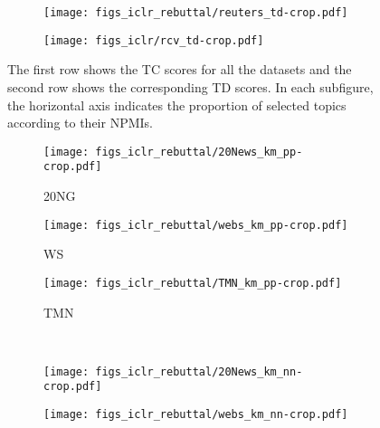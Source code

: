 \documentclass{article}
\begin{document}
\begin{figure}[t]
\begin{subfigure}[b]{0.19\linewidth}
                 \centering
                 \texttt{[image: figs\_iclr\_rebuttal/reuters\_td-crop.pdf]}
         \end{subfigure}
          \begin{subfigure}[b]{0.19\linewidth}
                 \centering
                 \texttt{[image: figs\_iclr/rcv\_td-crop.pdf]}
         \end{subfigure}
\caption{The first row shows the TC scores for all the datasets and the second row shows the corresponding TD scores. In each subfigure, the horizontal axis indicates the proportion of selected topics according to their NPMIs.}
\label{fig-tc-td}
 \vspace{-0.5cm}
\end{figure}
\begin{figure}
        \centering
        \begin{minipage}{0.68\textwidth}
         \begin{subfigure}[b]{0.32\linewidth}
                 \centering
                 \caption{20NG}
                 \texttt{[image: figs\_iclr\_rebuttal/20News\_km\_pp-crop.pdf]}
         \end{subfigure}
         \begin{subfigure}[b]{0.32\linewidth}
                 \centering
                 \caption{WS}
                 \texttt{[image: figs\_iclr\_rebuttal/webs\_km\_pp-crop.pdf]}
         \end{subfigure} 
         \begin{subfigure}[b]{0.32\linewidth}
                 \centering
                 \caption{TMN}
                 \texttt{[image: figs\_iclr\_rebuttal/TMN\_km\_pp-crop.pdf]}
         \end{subfigure}\vspace{0.3cm}
        \\
               \centering
         \begin{subfigure}[b]{0.32\linewidth}
                 \centering
                 \texttt{[image: figs\_iclr\_rebuttal/20News\_km\_nn-crop.pdf]}
         \end{subfigure}
         \begin{subfigure}[b]{0.32\linewidth}
                 \centering
                 \texttt{[image: figs\_iclr\_rebuttal/webs\_km\_nn-crop.pdf]}
         \end{subfigure} 
         \begin{subfigure}[b]{0.32\linewidth}

\end{subfigure}
\end{minipage}
\end{figure}
\end{document}
